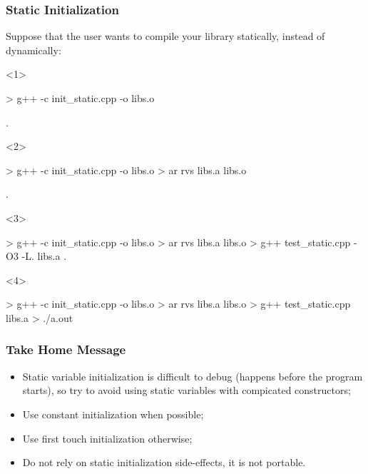 \documentclass[aspectratio=43]{beamer}
\begin{document}
\begin{frame}[fragile]\frametitle{Static Initialization}
  Suppose that the user wants to compile your library statically, instead of dynamically:

  \begin{onlyenv}<1>
\begin{Shelllisting}{}
> g++ -c init_static.cpp -o libs.o


.
\end{Shelllisting}
  \end{onlyenv}
  \begin{onlyenv}<2>
\begin{Shelllisting}{}
> g++ -c init_static.cpp -o libs.o
> ar rvs libs.a libs.o

.
\end{Shelllisting}
  \end{onlyenv}
  \begin{onlyenv}<3>
\begin{Shelllisting}{}
> g++ -c init_static.cpp -o libs.o
> ar rvs libs.a libs.o
> g++ test_static.cpp -O3 -L. libs.a
.
\end{Shelllisting}
  \end{onlyenv}
  \begin{onlyenv}<4>
\begin{Shelllisting}{}
> g++ -c init_static.cpp -o libs.o
> ar rvs libs.a libs.o
> g++ test_static.cpp libs.a
> ./a.out
\end{Shelllisting}
  \end{onlyenv}
\end{frame}


\begin{frame}[fragile]\frametitle{Take Home Message}

  \begin{itemize}
  \item Static variable initialization is difficult to debug (happens before the program starts),
    so try to avoid using static variables with compicated constructors;
  \item Use constant initialization when possible;
  \item Use first touch initialization otherwise;
  \item Do not rely on static initialization side-effects, it is not portable.
  \end{itemize}
\end{frame}
\end{document}
